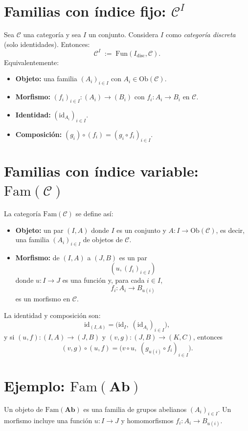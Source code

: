 \documentclass[12pt,oneside]{book}
\theoremstyle{definition}
\begin{document}
\section{Familias con índice fijo: \texorpdfstring{$\mathcal{C}^I$}{C\^{}I}}
Sea $\mathcal{C}$ una categoría y sea $I$ un conjunto. Considera $I$ como
\emph{categoría discreta} (solo identidades). Entonces:
\[
\mathcal{C}^I \;:=\; \mathrm{Fun}(I_{\mathrm{disc}},\mathcal{C}).
\]
Equivalentemente:
\begin{itemize}[leftmargin=1.5em]
  \item \textbf{Objeto:} una familia $(A_i)_{i\in I}$ con $A_i\in \mathrm{Ob}(\mathcal{C})$.
  \item \textbf{Morfismo:} $(f_i)_{i\in I}:(A_i)\to(B_i)$ con $f_i:A_i\to B_i$ en $\mathcal{C}$.
  \item \textbf{Identidad:} $(\mathrm{id}_{A_i})_{i\in I}$.
  \item \textbf{Composición:} $(g_i)\circ(f_i)=(g_i\circ f_i)_{i\in I}$.
\end{itemize}

\section{Familias con índice variable: \texorpdfstring{$\mathrm{Fam}(\mathcal{C})$}{Fam(C)}}
La categoría $\mathrm{Fam}(\mathcal{C})$ se define así:
\begin{itemize}[leftmargin=1.5em]
  \item \textbf{Objeto:} un par $(I,A)$ donde $I$ es un conjunto y
  $A:I\to \mathrm{Ob}(\mathcal{C})$, es decir, una familia $(A_i)_{i\in I}$ de objetos de $\mathcal{C}$.
  \item \textbf{Morfismo:} de $(I,A)$ a $(J,B)$ es un par
  \[
    (u,(f_i)_{i\in I})
  \]
  donde $u:I\to J$ es una función y, para cada $i\in I$,
  \[
    f_i: A_i \longrightarrow B_{u(i)}
  \]
  es un morfismo en $\mathcal{C}$.
\end{itemize}
La identidad y composición son:
\[
\mathrm{id}_{(I,A)}=\Big(\mathrm{id}_I,\;(\mathrm{id}_{A_i})_{i\in I}\Big),
\]
y si $(u,f):(I,A)\to(J,B)$ y $(v,g):(J,B)\to(K,C)$, entonces
\[
(v,g)\circ(u,f)=\Big(v\circ u,\;(g_{u(i)}\circ f_i)_{i\in I}\Big).
\]

\section{Ejemplo: \texorpdfstring{$\mathrm{Fam}(\mathbf{Ab})$}{Fam(Ab)}}
Un objeto de $\mathrm{Fam}(\mathbf{Ab})$ es una familia de grupos abelianos
$(A_i)_{i\in I}$. Un morfismo incluye una función $u:I\to J$ y homomorfismos
$f_i:A_i\to B_{u(i)}$.
\end{document}
